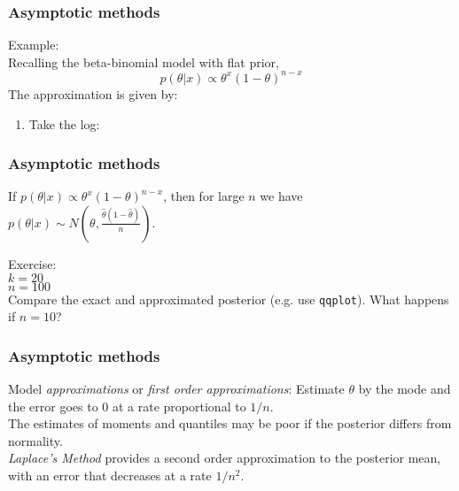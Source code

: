 \documentclass{beamer}
\newcommand{\1}{\ensuremath{\mathbf{1}}}
\begin{document}
%
%
%
\begin{frame}\frametitle{Asymptotic methods}
	Example:\\
	Recalling the beta-binomial model with flat prior,\\
	\begin{equation}
		p(\theta|x) \propto \theta^x (1-\theta)^{n-x}
	\end{equation}
	The approximation is given by:
	\begin{enumerate}
		\item Take the log: \visible<2-5>{$l(\theta) = x \log\theta + (n-x) \log(1-\theta)$}
	\end{enumerate}
\end{frame}
%
%
%
\begin{frame}\frametitle{Asymptotic methods}
	\begin{block}{}
		If $p(\theta|x) \propto \theta^x (1-\theta)^{n-x}$, then for large $n$ we have\\ $p(\theta|x) \sim N(\theta,\tfrac{\hat\theta (1-\hat\theta)}{n})$.
	\end{block}
	Exercise:\\
	$k = 20$\\
	$n = 100$\\
	Compare the exact and approximated posterior (e.g. use \texttt{qqplot}). What happens if $n = 10$?
\end{frame}
%
%
%
\begin{frame}\frametitle{Asymptotic methods}
	Model \emph{approximations} or \emph{first order approximations}: Estimate $\theta$ by the mode and the error goes to 0 at a rate proportional to $1/n$.\\[2ex]
	The estimates of moments and quantiles may be poor if the posterior differs from normality.\\[2ex]
	\emph{Laplace’s Method} provides a second order approximation to the posterior mean, with an error that decreases at a rate $1/n^2$.
\end{frame}
\end{document}
